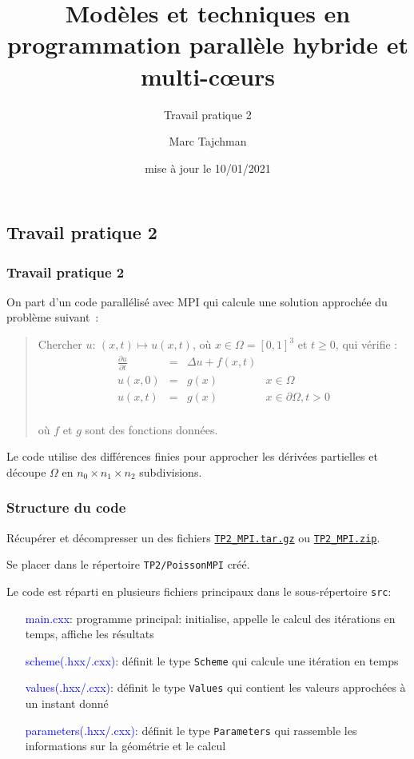 \documentclass{beamer}
\title{Modèles et techniques en programmation parallèle hybride et multi-c\oe urs}
\subtitle{Travail pratique 2}
\author{Marc Tajchman}\institute{CEA - DEN/DM2S/STMF/LMES}
\date{mise à jour le 10/01/2021}
\newcommand\Frac[2]{\frac{\displaystyle #1}{\displaystyle #2}}
\begin{document}
\begin{frame}
	\titlepage
\end{frame}

\large
\begin{frame}
	\section{Travail pratique 2}
	\frametitle{Travail pratique 2}

On part d'un code parallélisé avec MPI qui calcule une solution approchée du problème suivant~:

\medskip
\begin{quote}
Chercher $u$:  $(x, t) \mapsto u(x, t)$, où  $x \in \Omega = [0,1]^3$ et $t \geq 0$, qui vérifie :
$$
\begin{array}{lcll}
\Frac{\partial u}{\partial t} & = & \Delta u + f(x, t) & \\[0.3cm]
u(x, 0) &=& g(x) & x\in \Omega \\[0.3cm]
u(x, t) & = & g(x) & x\in\partial \Omega, t > 0\\[0.3cm]
\end{array}
$$

\vspace{-0.6cm}
où $f$ et $g$ sont des fonctions données.
\end{quote}

Le code utilise des différences finies pour approcher les dérivées partielles et découpe $\Omega$ en $n_0\times n_1\times n_2$ subdivisions.

\end{frame}

\begin{frame}
	\frametitle{Structure du code}
	
	Récupérer et décompresser un des fichiers \href{https://perso.ensta-paris.fr/~tajchman/Seance5/TP2_MPI.tar.gz}{\tt TP2\_MPI.tar.gz} ou \href{https://perso.ensta-paris.fr/~tajchman/Seance5/TP2_MPI.zip}{\tt TP2\_MPI.zip}.
	
    \medskip
	 Se placer dans le répertoire {\tt TP2/PoissonMPI} créé. 
	
	Le code est réparti en plusieurs fichiers principaux dans le sous-répertoire {\tt src}:
    \medskip
    
	\hfill\begin{minipage}{8cm}
	\begin{itemize}
		\item[\textcolor{blue}{main.cxx}:] programme principal: initialise, appelle le calcul des itérations en temps, affiche les résultats 
		\item[\textcolor{blue}{scheme(.hxx/.cxx)}:] définit le type {\tt Scheme} qui calcule une itération en temps
		\item[\textcolor{blue}{values(.hxx/.cxx)}:] définit le type {\tt Values} qui contient les valeurs approchées à un instant donné
		\item[\textcolor{blue}{parameters(.hxx/.cxx)}:] définit le type {\tt Parameters} qui rassemble les informations sur la géométrie et le calcul
	\end{itemize}
    \end{minipage}
\vfill
\end{frame}
\end{document}
